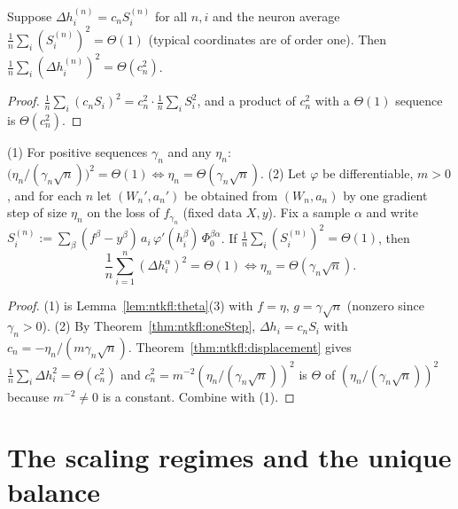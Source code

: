 \begin{theorem}\label{thm:ntkfl:displacement}
  \leanok
Suppose $\Delta h_i^{(n)}=c_nS_i^{(n)}$ for all $n,i$ and the neuron average $\frac1n\sum_i(S_i^{(n)})^2=\Theta(1)$ (typical coordinates are of order one).
Then $\frac1n\sum_i(\Delta h_i^{(n)})^2=\Theta(c_n^2)$.
\end{theorem}

\begin{proof}
  \leanok
$\frac1n\sum_i(c_nS_i)^2=c_n^2\cdot\frac1n\sum_iS_i^2$, and a product of $c_n^2$ with a $\Theta(1)$ sequence is $\Theta(c_n^2)$.
\end{proof}

\begin{theorem}\label{thm:ntkfl:criterion}
  \leanok
(1) For positive sequences $\gamma_n$ and any $\eta_n$:
$\bigl(\eta_n/(\gamma_n\sqrt n)\bigr)^2=\Theta(1)\iff\eta_n=\Theta(\gamma_n\sqrt n)$.
(2) Let $\varphi$ be differentiable, $m>0$, and for each $n$ let $(W_n',a_n')$ be obtained from $(W_n,a_n)$ by one gradient step of size $\eta_n$ on the loss of $f_{\gamma_n}$ (fixed data $X,y$).
Fix a sample $\alpha$ and write $S_i^{(n)}:=\sum_\beta(f^\beta-y^\beta)\,a_i\,\varphi'(h_i^\beta)\,\Phi_0^{\beta\alpha}$. If $\frac1n\sum_i(S_i^{(n)})^2=\Theta(1)$, then
\[
  \frac1n\sum_{i=1}^n(\Delta h_i^\alpha)^2=\Theta(1)\iff\eta_n=\Theta(\gamma_n\sqrt n).
\]
\end{theorem}

\begin{proof}
  \leanok
(1) is Lemma~\ref{lem:ntkfl:theta}(3) with $f=\eta$, $g=\gamma\sqrt n$ (nonzero since $\gamma_n>0$). (2) By Theorem~\ref{thm:ntkfl:oneStep}, $\Delta h_i=c_nS_i$ with $c_n=-\eta_n/(m\gamma_n\sqrt n)$.
Theorem~\ref{thm:ntkfl:displacement} gives $\frac1n\sum_i\Delta h_i^2=\Theta(c_n^2)$ and $c_n^2=m^{-2}(\eta_n/(\gamma_n\sqrt n))^2$ is $\Theta$ of $(\eta_n/(\gamma_n\sqrt n))^2$ because $m^{-2}\ne0$ is a constant. Combine with (1).
\end{proof}


\section{The scaling regimes and the unique balance}\label{sec:ntkfl:regimes}

